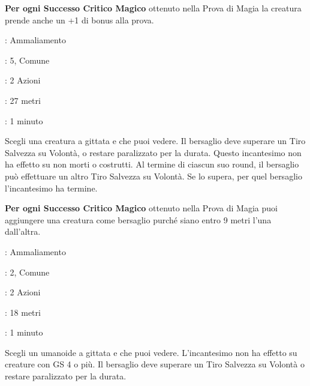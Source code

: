 \begin{multicols}{2}
\textbf{Per ogni Successo Critico Magico} ottenuto nella Prova di Magia la creatura prende anche un +1 di bonus alla prova.

\noindent\colorbox{OBSSgold!10}{
\begin{minipage}{0.95\linewidth}
\begin{description}[noitemsep, topsep=0pt, parsep=0pt, partopsep=0pt, leftmargin=0cm, labelwidth=1.3cm]
	\item[\textbf{Lista}]: Ammaliamento
	\item[\textbf{Livello}]: 5, Comune
	\item[\textbf{Lancio}]: 2 Azioni
	\item[\textbf{Gittata}]: 27 metri
	\item[\textbf{Durata}]: 1 minuto
\end{description}
\end{minipage}}\smallskip

Scegli una creatura a gittata e che puoi vedere. Il bersaglio deve superare un Tiro Salvezza su Volontà, o restare paralizzato per la durata. Questo incantesimo non ha effetto su non morti o costrutti. Al termine di ciascun suo round, il bersaglio può effettuare un altro Tiro Salvezza su Volontà. Se lo supera, per quel bersaglio l'incantesimo ha termine.

\textbf{Per ogni Successo Critico Magico} ottenuto nella Prova di Magia puoi aggiungere una creatura come bersaglio purché siano entro 9 metri l'una dall'altra.

\noindent\colorbox{OBSSgold!10}{
\begin{minipage}{0.95\linewidth}
\begin{description}[noitemsep, topsep=0pt, parsep=0pt, partopsep=0pt, leftmargin=0cm, labelwidth=1.3cm]
	\item[\textbf{Lista}]: Ammaliamento
	\item[\textbf{Livello}]: 2, Comune
	\item[\textbf{Lancio}]: 2 Azioni
	\item[\textbf{Gittata}]: 18 metri
	\item[\textbf{Durata}]: 1 minuto
\end{description}
\end{minipage}}\smallskip

Scegli un umanoide a gittata e che puoi vedere. L'incantesimo non ha effetto su creature con GS 4 o più. Il bersaglio deve superare un Tiro Salvezza su Volontà o restare paralizzato per la durata.


\end{multicols}
